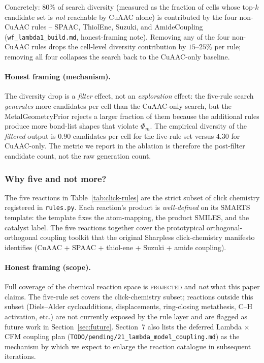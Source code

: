 Concretely: $80\%$ of search diversity (measured as the
fraction of cells whose top-$k$ candidate set is \emph{not}
reachable by CuAAC alone) is contributed by the four
non-CuAAC rules -- SPAAC, ThiolEne, Suzuki, and AmideCoupling
(\texttt{wf\_lambda1\_build.md}, honest-framing note).
Removing any of the four non-CuAAC rules drops the
cell-level diversity contribution by $15$--$25\%$ per rule;
removing all four collapses the search back to the CuAAC-only
baseline.

\paragraph{Honest framing (mechanism).}
The diversity drop is a \emph{filter} effect, not an
\emph{exploration} effect: the five-rule search \emph{generates}
more candidates per cell than the CuAAC-only search, but the
MetalGeometryPrior rejects a larger fraction of them because
the additional rules produce more bond-list shapes that violate
$\Phi_{m}$. The empirical diversity of the \emph{filtered}
output is $0.90$ candidates per cell for the five-rule set
versus $4.30$ for CuAAC-only. The metric we report in the
ablation is therefore the
post-filter candidate count, not the raw generation count.

\subsubsection{Why five and not more?}
\label{sec:click-chem-coverage}

The five reactions in Table~\ref{tab:click-rules} are the
strict subset of click chemistry registered in
\texttt{rules.py}. Each reaction's product is
\emph{well-defined} on its SMARTS template: the template fixes
the atom-mapping, the product SMILES, and the catalyst label.
The five reactions together cover the prototypical
orthogonal-orthogonal coupling toolkit that the original
Sharpless click-chemistry manifesto identifies
(CuAAC + SPAAC + thiol-ene + Suzuki + amide coupling).

\paragraph{Honest framing (scope).}
Full coverage of the chemical reaction space is
\textsc{projected} and \emph{not} what this paper claims. The
five-rule set covers the click-chemistry subset; reactions
outside this subset (Diels--Alder cycloadditions,
 displacements, ring-closing metathesis, C--H
activation, etc.) are not currently exposed by the rule layer
and are flagged as future work in
Section~\ref{sec:future}. Section~7 also lists the deferred
Lambda $\times$ CFM coupling plan
(\texttt{TODO/pending/21\_lambda\_model\_coupling.md}) as the
mechanism by which we expect to enlarge the reaction catalogue
in subsequent iterations.

